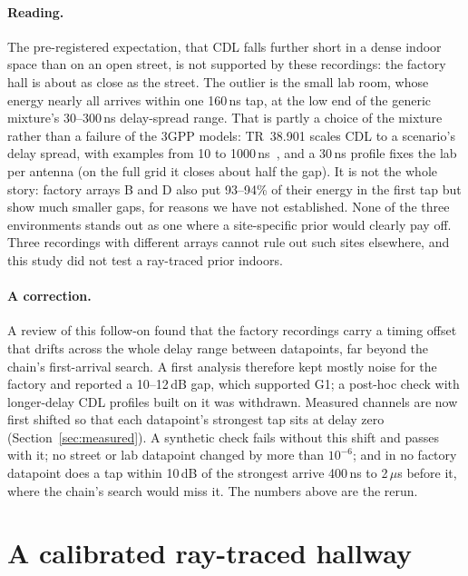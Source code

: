 \documentclass[11pt]{article}
\begin{document}
\paragraph{Reading.} The pre-registered expectation, that CDL falls further
short in a dense indoor space than on an open street, is not supported by
these recordings: the factory hall is about as close as the street. The
outlier is the small lab room, whose energy nearly all arrives within one
160\,ns tap, at the low end of the generic mixture's 30--300\,ns delay-spread
range. That is partly a choice of the mixture rather than a failure of the
3GPP models: TR~38.901 scales CDL to a scenario's delay spread, with examples
from 10 to 1000\,ns~\cite{tr38901}, and a 30\,ns profile fixes the lab per
antenna (on the full grid it closes about half the gap). It is not the whole
story: factory arrays B and D also put 93--94\% of their energy in the first
tap but show much smaller gaps, for reasons we have not established. None of
the three environments stands out as one where a site-specific prior would
clearly pay off. Three recordings with different arrays cannot rule out such
sites elsewhere, and this study did not test a ray-traced prior indoors.

\paragraph{A correction.} A review of this follow-on found that the factory
recordings carry a timing offset that drifts across the whole delay range
between datapoints, far beyond the chain's first-arrival search. A first
analysis therefore kept mostly noise for the factory and reported a
10--12\,dB gap, which supported G1; a post-hoc check with longer-delay CDL
profiles built on it was withdrawn. Measured channels are now first shifted so
that each datapoint's strongest tap sits at delay zero
(Section~\ref{sec:measured}). A synthetic check fails without this shift and
passes with it; no street or lab datapoint changed by more than $10^{-6}$; and
in no factory datapoint does a tap within 10\,dB of the strongest arrive 400\,ns to 2\,$\mu$s
before it, where the chain's search would miss it. The numbers
above are the rerun.


\section{A calibrated ray-traced hallway}\label{sec:hallway}
\end{document}
